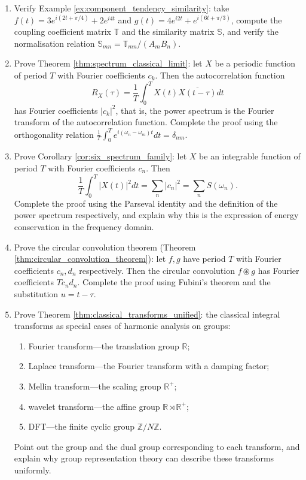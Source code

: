 \begin{enumerate}[leftmargin=3em, label=\textbf{Exercise \arabic*}]
    \item Verify Example \ref{ex:component_tendency_similarity}:
    take $f(t)=3e^{i(2t+\pi/4)}+2e^{i4t}$ and $g(t)=4e^{i2t}+e^{i(6t+\pi/3)}$,
    compute the coupling coefficient matrix $\mathbb{T}$ and the similarity matrix $\mathbb{S}$,
    and verify the normalisation relation $\mathbb{S}_{mn}=\mathbb{T}_{mn}/(A_mB_n)$.

    \item Prove Theorem \ref{thm:spectrum_classical_limit}:
    let $X$ be a periodic function of period $T$ with Fourier coefficients $c_k$. Then the autocorrelation function
    \[
    R_X(\tau)=\frac1T\int_0^TX(t)\overline{X(t-\tau)}dt
    \]
    has Fourier coefficients $|c_k|^2$, that is, the power spectrum is the Fourier transform of the autocorrelation function.
    Complete the proof using the orthogonality relation $\frac1T\int_0^Te^{i(\omega_n-\omega_m)t}dt=\delta_{nm}$.

    \item Prove Corollary \ref{cor:six_spectrum_family}:
    let $X$ be an integrable function of period $T$ with Fourier coefficients $c_n$. Then
    \[
    \frac1T\int_0^T|X(t)|^2dt=\sum_n|c_n|^2=\sum_nS(\omega_n).
    \]
    Complete the proof using the Parseval identity and the definition of the power spectrum respectively,
    and explain why this is the expression of energy conservation in the frequency domain.

    \item Prove the circular convolution theorem (Theorem \ref{thm:circular_convolution_theorem}):
    let $f,g$ have period $T$ with Fourier coefficients $c_n,d_n$ respectively. Then
    the circular convolution $f\circledast g$ has Fourier coefficients $Tc_nd_n$.
    Complete the proof using Fubini's theorem and the substitution $u=t-\tau$.

    \item Prove Theorem \ref{thm:classical_transforms_unified}:
    the classical integral transforms as special cases of harmonic analysis on groups:
    \begin{enumerate}[label=(\roman*)]
        \item Fourier transform---the translation group $\mathbb{R}$;
        \item Laplace transform---the Fourier transform with a damping factor;
        \item Mellin transform---the scaling group $\mathbb{R}^+$;
        \item wavelet transform---the affine group $\mathbb{R}\rtimes\mathbb{R}^+$;
        \item DFT---the finite cyclic group $\mathbb{Z}/N\mathbb{Z}$.
    \end{enumerate}
    Point out the group and the dual group corresponding to each transform,
    and explain why group representation theory can describe these transforms uniformly.


\end{enumerate}
